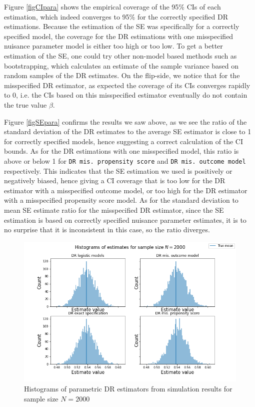 \documentclass[12pt,twoside]{article}
\begin{document}
Figure \ref{figCIpara} shows the empirical coverage of the 95\% CIs of each estimation, which indeed converges to 95\% for the correctly specified DR estimations. Because the estimation of the SE was specifically for a correctly specified model, the coverage for the DR estimations with one misspecified nuisance parameter model is either too high or too low. To get a better estimation of the SE, one could try other non-model based methods such as bootstrapping, which calculates an estimate of the sample variance based on random samples of the DR estimates. On the flip-side, we notice that for the misspecified DR estimator, as expected the coverage of its CIs converges rapidly to 0, i.e. the CIs based on this misspecified estimator eventually do not contain the true value $\beta$.

Figure \ref{figSEpara} confirms the results we saw above, as we see the ratio of the standard deviation of the DR estimates to the average SE estimator is close to 1 for correctly specified models, hence suggesting a correct calculation of the CI bounds. As for the DR estimations with one misspecified model, this ratio is above or below 1 for \texttt{DR mis. propensity score} and \texttt{DR mis. outcome model} respectively. This indicates that the SE estimation we used is positively or negatively biased, hence giving a CI coverage that is too low for the DR estimator with a misspecified outcome model, or too high for the DR estimator with a misspecified propensity score model. As for the standard deviation to mean SE estimate ratio for the misspecified DR estimator, since the SE estimation is based on correctly specified nuisance parameter estimates, it is to no surprise that it is inconsistent in this case, so the ratio diverges.

\begin{figure}[h!]
    \centering
    \includegraphics[width = 0.9\columnwidth]{figures/histpara.png}
    \caption{Histograms of parametric DR estimators from simulation results for sample size $N = 2000$}
    \label{fighistpara}
\end{figure}
\end{document}
